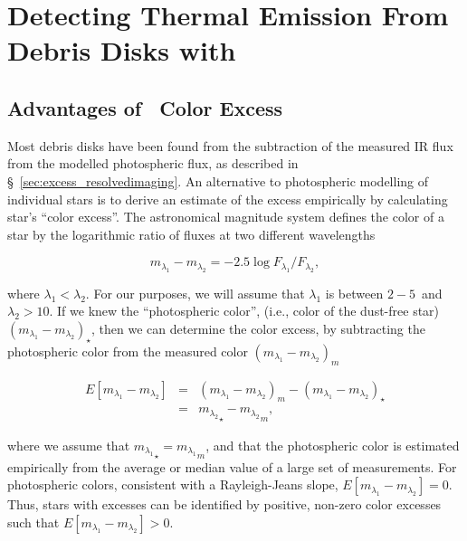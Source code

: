     
    
\section{Detecting Thermal Emission From Debris Disks with \WS}

    \subsection{Advantages of \WS\ Color Excess}\label{sec:advantage_wise}
    
    Most debris disks have been found from the subtraction of the measured IR flux from the modelled photospheric flux, as described in \S~\ref{sec:excess_resolvedimaging}. An alternative to photospheric modelling of individual stars is to derive an estimate of the excess empirically by calculating star's ``color excess''. The astronomical magnitude system defines the color of a star by the logarithmic ratio of fluxes at two different wavelengths
    
    \begin{equation}\label{eq:color}
    m_{\lambda_1} - m_{\lambda_2} = -2.5\log{F_{\lambda_1}/F_{\lambda_2}},
    \end{equation}
    
    \noindent where $\lambda_1<\lambda_2$. For our purposes, we will assume that $\lambda_1$ is between $2-5$\micron\ and $\lambda_2>10$\micron. If we knew the ``photospheric color'', (i.e., color of the dust-free star) ${\left(m_{\lambda_1} - m_{\lambda_2}\right)}_\star$, then we can determine the color excess, by subtracting the photospheric color from the measured color ${\left(m_{\lambda_1} - m_{\lambda_2}\right)}_m$
    
    \begin{eqnarray}\label{eq:color_excess}
    E\left[m_{\lambda_1} - m_{\lambda_2}\right] &=& {\left(m_{\lambda_1} - m_{\lambda_2}\right)}_m - {\left(m_{\lambda_1} - m_{\lambda_2}\right)}_\star \\ 
    &=& {m_{\lambda_2}}_\star - {m_{\lambda_2}}_m,
    \end{eqnarray}
    
    \noindent where we assume that ${m_{\lambda_1}}_\star = {m_{\lambda_1}}_m$, and that the photospheric color is estimated empirically from the average or median value of a large set of measurements. For photospheric colors, consistent with a Rayleigh-Jeans slope, $E\left[m_{\lambda_1} - m_{\lambda_2}\right]=0$. Thus, stars with excesses can be identified by positive, non-zero color excesses such that $E\left[m_{\lambda_1} - m_{\lambda_2}\right]>0$. 
    
